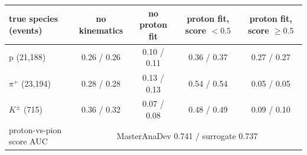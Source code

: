 \begin{tabular}{lcccc}
\toprule
true species (events) & no kinematics & no proton fit & proton fit, score $<0.5$ & proton fit, score $\geq 0.5$ \\
\midrule
p (21,188) & 0.26 / 0.26 & 0.10 / 0.11 & 0.36 / 0.37 & 0.27 / 0.27 \\
$\pi^+$ (23,194) & 0.28 / 0.28 & 0.13 / 0.13 & 0.54 / 0.54 & 0.05 / 0.05 \\
$K^\pm$ (715) & 0.36 / 0.32 & 0.07 / 0.08 & 0.48 / 0.49 & 0.09 / 0.10 \\
\midrule
proton-vs-pion score AUC & \multicolumn{4}{c}{MasterAnaDev 0.741 / surrogate 0.737} \\
\bottomrule
\end{tabular}
